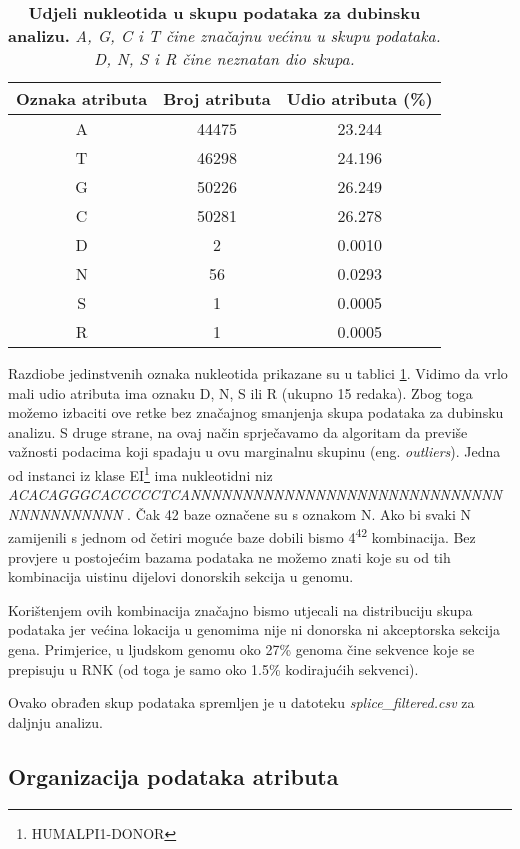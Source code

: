 \begin{table}[!ht]
   \caption[Udjeli nukleotida u skupu podataka za dubinsku analizu]{
   \textbf{Udjeli nukleotida u skupu podataka za dubinsku analizu.} \textit{A, G, C i T čine značajnu većinu u skupu podataka. D, N, S i R čine neznatan dio skupa.}}
   \centering
   \begin{tabular}{||c | c | c ||}
   \hline
   Oznaka atributa & Broj atributa & Udio atributa (\%) \\ [0.5ex]
   \hline\hline
   A & 44475 & 23.244 \\
   T & 46298 & 24.196 \\
   G & 50226 & 26.249 \\
   C & 50281 & 26.278 \\
   D & 2  & 0.0010 \\
   N & 56 & 0.0293 \\
   S & 1  & 0.0005 \\
   R & 1  & 0.0005 \\ [1ex]
   \hline
   \end{tabular}
   \label{tab:udjeli}
\end{table}
Razdiobe jedinstvenih oznaka nukleotida prikazane su u tablici \ref{tab:udjeli}. Vidimo da vrlo mali udio atributa ima oznaku D, N, S ili R (ukupno 15 redaka). Zbog toga možemo izbaciti ove retke bez značajnog smanjenja skupa podataka za dubinsku analizu. S druge strane, na ovaj način sprječavamo da algoritam da previše važnosti podacima koji spadaju u ovu marginalnu skupinu (eng. \textit{outliers}). 
Jedna od instanci iz klase EI\footnote{HUMALPI1-DONOR} ima nukleotidni niz\textit{ 
ACACAGGGCACCCCCTCANNNNNNNNNNNNNNNNNNNNNNNNNNNNNNNNNNNNNNNNN
}. Čak 42 baze označene su s oznakom N. Ako bi svaki N zamijenili s jednom od četiri moguće baze dobili bismo 4\textsuperscript{42} kombinacija. Bez provjere u postojećim bazama podataka ne možemo znati koje su od tih kombinacija uistinu dijelovi donorskih sekcija u genomu.

Korištenjem ovih kombinacija značajno bismo utjecali na distribuciju skupa podataka jer većina lokacija u genomima nije ni donorska ni akceptorska sekcija gena. Primjerice, u ljudskom genomu oko 27\% genoma čine sekvence koje se prepisuju u RNK (od toga je samo oko 1.5\% kodirajućih sekvenci)\cite{Berg01}.

Ovako obrađen skup podataka spremljen je u datoteku \textit{splice\_filtered.csv} za daljnju analizu.

\subsection{Organizacija podataka atributa}

